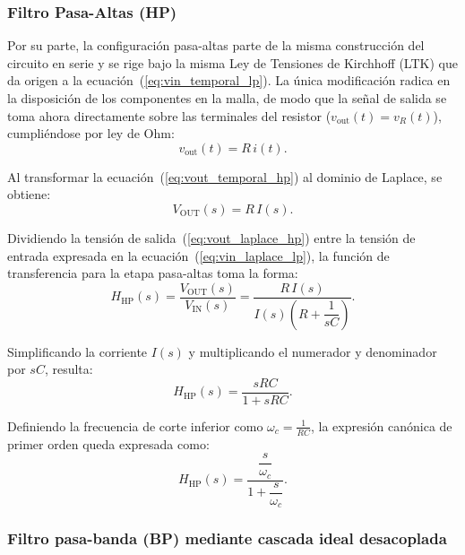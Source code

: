 \documentclass[twocolumn]{article}
\begin{document}
\subsubsection{Filtro Pasa-Altas (HP)}

Por su parte, la configuración pasa-altas parte de la misma construcción del circuito en serie y se rige bajo la misma Ley de Tensiones de Kirchhoff (LTK) que da origen a la ecuación~(\ref{eq:vin_temporal_lp}). La única modificación radica en la disposición de los componentes en la malla, de modo que la señal de salida se toma ahora directamente sobre las terminales del resistor ($v_{\text{out}}(t) = v_R(t)$), cumpliéndose por ley de Ohm:
\begin{equation}
v_{\text{out}}(t) = R \, i(t).
\label{eq:vout_temporal_hp}
\end{equation}

Al transformar la ecuación~(\ref{eq:vout_temporal_hp}) al dominio de Laplace, se obtiene:
\begin{equation}
V_{\text{OUT}}(s) = R \, I(s).
\label{eq:vout_laplace_hp}
\end{equation}

Dividiendo la tensión de salida~(\ref{eq:vout_laplace_hp}) entre la tensión de entrada expresada en la ecuación~(\ref{eq:vin_laplace_lp}), la función de transferencia para la etapa pasa-altas toma la forma:
\begin{equation}
H_{\text{HP}}(s) = \frac{V_{\text{OUT}}(s)}{V_{\text{IN}}(s)} = \frac{R \, I(s)}{I(s) \left( R + \dfrac{1}{sC} \right)}.
\end{equation}

Simplificando la corriente $I(s)$ y multiplicando el numerador y denominador por $sC$, resulta:
\begin{equation}
H_{\text{HP}}(s) = \frac{sRC}{1 + sRC}.
\label{eq:hs_hp}
\end{equation}

Definiendo la frecuencia de corte inferior como $\omega_c = \frac{1}{RC}$, la expresión canónica de primer orden queda expresada como:
\begin{equation}
H_{\text{HP}}(s) = \frac{\dfrac{s}{\omega_c}}{1 + \dfrac{s}{\omega_c}}.
\end{equation}

\subsubsection{Filtro pasa-banda (BP) mediante cascada ideal desacoplada}
\end{document}
